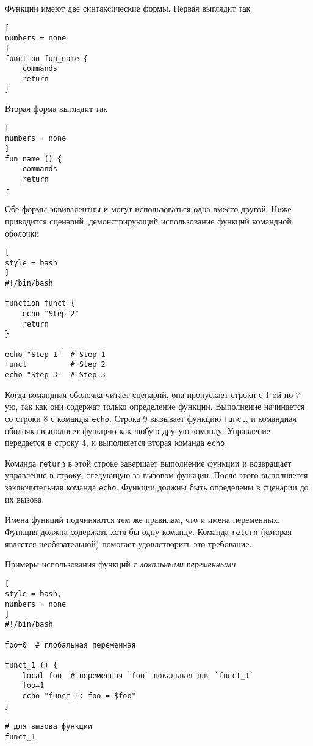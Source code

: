 \documentclass[%
	11pt,
	a4paper,
	utf8,
		]{article}
\begin{document}
Функции имеют две синтаксические формы. Первая выглядит так
\begin{lstlisting}[
numbers = none
]
function fun_name {
    commands
    return 
}
\end{lstlisting}

Вторая форма выгладит так
\begin{lstlisting}[
numbers = none
]
fun_name () {
    commands
    return
}
\end{lstlisting}

Обе формы эквивалентны и могут использоваться одна вместо другой. Ниже приводится сценарий, демонстрирующий использование функций командной оболочки
\begin{lstlisting}[
style = bash
]
#!/bin/bash

function funct {
    echo "Step 2"
    return
}

echo "Step 1"  # Step 1
funct          # Step 2
echo "Step 3"  # Step 3
\end{lstlisting}

Когда командная оболочка читает сценарий, она пропускает строки с 1-ой по 7-ую, так как они содержат только определение функции. Выполнение начинается со строки 8 с команды \texttt{echo}. Строка 9 вызывает функцию \texttt{funct}, и командная оболочка выполняет функцию как любую другую команду. Управление передается в строку 4, и выполняется вторая команда \texttt{echo}.

Команда \texttt{return} в этой строке завершает выполнение функции и возвращает управление в строку, следующую за вызовом функции. После этого выполняется заключительная команда \texttt{echo}. Функции должны быть определены в сценарии до их вызова.

Имена функций подчиняются тем же правилам, что и имена переменных. Функция должна содержать хотя бы одну команду. Команда \texttt{return} (которая является необязательной) помогает удовлетворить это требование.

Примеры использования функций с \emph{локальными переменными}

\begin{lstlisting}[
style = bash,
numbers = none
]
#!/bin/bash

foo=0  # глобальная переменная

funct_1 () {
    local foo  # переменная `foo` локальная для `funct_1`
    foo=1
    echo "funct_1: foo = $foo"
}

# для вызова функции
funct_1
\end{lstlisting}
\end{document}
